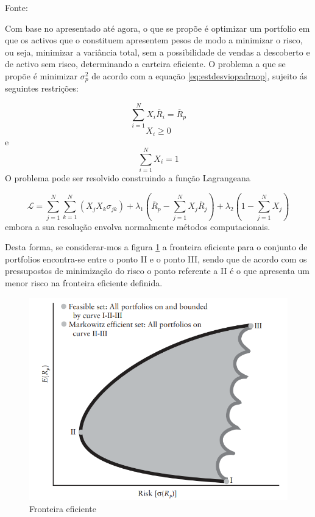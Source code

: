 \documentclass[
  12pt,
  a4paper,
  openany]{book}
\begin{document}
Fonte: \citep[pp.58]{Goetzmann2014}

\justifying
\bigskip

Com base no apresentado até agora, o que se propõe é optimizar um portfolio em que os activos que o constituem apresentem pesos de modo a minimizar o risco, ou seja, minimizar a variância total, sem a possibilidade de vendas a descoberto e de activo sem risco, determinando a carteira eficiente. O problema a que se propõe é minimizar \(\sigma_{p}^{2}\) de acordo com a equação \eqref{eq:estdesviopadraop}, sujeito ás seguintes restrições:

\begin{equation} 
  \sum_{i=1}^{N}X_{i}\overline{R}_{i}=\overline{R}_{p}
  \label{eq:und}
\end{equation}
\[X_{i}\geq0\] e \[\sum_{i=1}^{N}X_{i}=1\]
O problema pode ser resolvido construindo a função Lagrangeana

\begin{equation} 
  \mathcal{L} = \sum_{j=1}^{N}\sum_{k=1}^{N}(X_{j}X_{k}\sigma_{jk})+\lambda_{1}(\overline{R}_{p}-\sum_{j=1}^{N}X_{j}\overline{R}_{j})+\lambda_{2}(1-\sum_{j=1}^{N}X_{j})
  \label{eq:estdesviopadraop}
\end{equation}
embora a sua resolução envolva normalmente métodos computacionais.

Desta forma, se considerar-mos a figura \ref{fig:eficient} a fronteira eficiente para o conjunto de portfolios encontra-se entre o ponto II e o ponto III, sendo que de acordo com os pressupostos de minimização do risco o ponto referente a II é o que apresenta um menor risco na fronteira eficiente definida.



\begin{figure}

{\centering \includegraphics[width=0.6\linewidth]{image/eficient} 

}

\caption{Fronteira eficiente}\label{fig:eficient}
\end{figure}
\FloatBarrier
\centering
\end{document}
